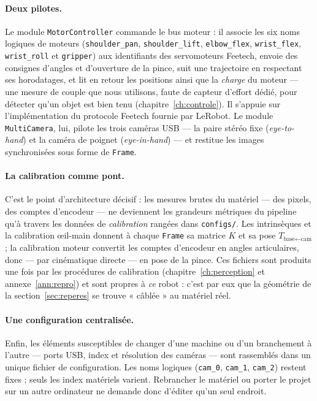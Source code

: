 \paragraph{Deux pilotes.} Le module \texttt{MotorController} commande le bus moteur : il associe les six noms logiques de moteurs (\texttt{shoulder\_pan}, \texttt{shoulder\_lift}, \texttt{elbow\_flex}, \texttt{wrist\_flex}, \texttt{wrist\_roll} et \texttt{gripper}) aux identifiants des servomoteurs Feetech, envoie des consignes d'angles et d'ouverture de la pince, suit une trajectoire en respectant ses horodatages, et lit en retour les positions ainsi que la \emph{charge} du moteur --- une mesure de couple que nous utilisons, faute de capteur d'effort dédié, pour détecter qu'un objet est bien tenu (chapitre~\ref{ch:controle}). Il s'appuie sur l'implémentation du protocole Feetech fournie par LeRobot. Le module \texttt{MultiCamera}, lui, pilote les trois caméras USB --- la paire stéréo fixe (\emph{eye-to-hand}) et la caméra de poignet (\emph{eye-in-hand}) --- et restitue les images synchronisées sous forme de \texttt{Frame}.

\paragraph{La calibration comme pont.} C'est le point d'architecture décisif : les mesures brutes du matériel --- des pixels, des comptes d'encodeur --- ne deviennent les grandeurs métriques du pipeline qu'à travers les données de \emph{calibration} rangées dans \texttt{configs/}. Les intrinsèques et la calibration œil-main donnent à chaque \texttt{Frame} sa matrice $K$ et sa pose $T_{\text{base}\leftarrow\text{cam}}$ ; la calibration moteur convertit les comptes d'encodeur en angles articulaires, donc --- par cinématique directe --- en pose de la pince. Ces fichiers sont produits une fois par les procédures de calibration (chapitre~\ref{ch:perception} et annexe~\ref{ann:repro}) et sont propres à \emph{ce} robot : c'est par eux que la géométrie de la section~\ref{sec:reperes} se trouve « câblée » au matériel réel.

\paragraph{Une configuration centralisée.} Enfin, les éléments susceptibles de changer d'une machine ou d'un branchement à l'autre --- ports USB, index et résolution des caméras --- sont rassemblés dans un unique fichier de configuration. Les noms logiques (\texttt{cam\_0}, \texttt{cam\_1}, \texttt{cam\_2}) restent fixes ; seuls les index matériels varient. Rebrancher le matériel ou porter le projet sur un autre ordinateur ne demande donc d'éditer qu'un seul endroit.

